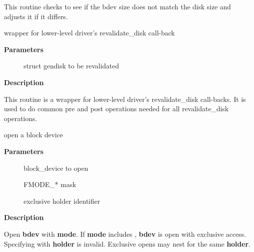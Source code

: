 \documentclass[a4paper,8pt,english]{sphinxmanual}
\begin{document}
This routine checks to see if the bdev size does not match the disk size
and adjusts it if it differs.

\begin{fulllineitems}
\label{filesystems/index:c.revalidate_disk}
wrapper for lower-level driver's revalidate\_disk call-back

\end{fulllineitems}


\textbf{Parameters}
\begin{description}
\item[{}] \leavevmode
struct gendisk to be revalidated

\end{description}

\textbf{Description}

This routine is a wrapper for lower-level driver's revalidate\_disk
call-backs.  It is used to do common pre and post operations needed
for all revalidate\_disk operations.

\begin{fulllineitems}
\label{filesystems/index:c.blkdev_get}
open a block device

\end{fulllineitems}


\textbf{Parameters}
\begin{description}
\item[{}] \leavevmode
block\_device to open

\item[{}] \leavevmode
FMODE\_* mask

\item[{}] \leavevmode
exclusive holder identifier

\end{description}

\textbf{Description}

Open \textbf{bdev} with \textbf{mode}.  If \textbf{mode} includes , \textbf{bdev} is
open with exclusive access.  Specifying  with 
\textbf{holder} is invalid.  Exclusive opens may nest for the same \textbf{holder}.
\end{document}
